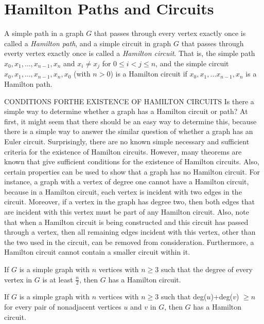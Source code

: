 \section{Hamilton Paths and Circuits}
\begin{definition}
A simple path in a graph $G$ that passes through every vertex exactly once is called a \textit{Hamilton path}, and a simple circuit in graph $G$ that passes through everty vertex exactly once is called a \textit{Hamilton circuit}. That is, the simple path $x_0,x_1,\dots ,x_{n-1},x_n$ and $x_i\neq x_j$ for $0 \le i  < j \le n$, and the simple circuit $x_0,x_1, \dots ,x_{n-1},x_n,x_0$ (with $n>0$) is a Hamilton circuit if $x_0,x_1, \dots x_{n-1},x_n$ is a Hamilton path.
\end{definition}
CONDITIONS FORTHE EXISTENCE OF HAMILTON CIRCUITS Is there a simple way
to determine whether a graph has a Hamilton circuit or path? At first, it might seem that there
should be an easy way to determine this, because there is a simple way to answer the similar
question of whether a graph has an Euler circuit. Surprisingly, there are no known simple
necessary and sufficient criteria for the existence of Hamilton circuits. However, many theorems
are known that give sufficient conditions for the existence of Hamilton circuits. Also, certain
properties can be used to show that a graph has no Hamilton circuit. For instance, a graph with a
vertex of degree one cannot have a Hamilton circuit, because in a Hamilton circuit, each vertex
is incident with two edges in the circuit. Moreover, if a vertex in the graph has degree two, then
both edges that are incident with this vertex must be part of any Hamilton circuit. Also, note
that when a Hamilton circuit is being constructed and this circuit has passed through a vertex,
then all remaining edges incident with this vertex, other than the two used in the circuit, can be
removed from consideration. Furthermore, a Hamilton circuit cannot contain a smaller circuit
within it.

\begin{theorem}
If $G$ is a simple graph with $n$ vertices with $n \ge 3$ such that the degree of every vertex in $G$ is at least $\frac{n}{2}$, then $G$ has a Hamilton circuit.
\end{theorem}

\begin{theorem}
If $G$ is a simple graph with $n$ vertices with $n \ge 3$ such that deg($u$)+deg($v$) $\ge n$ for every pair of nonadjacent vertices $u$ and $v$ in $G$, then $G$ has a Hamilton circuit.
\end{theorem}

